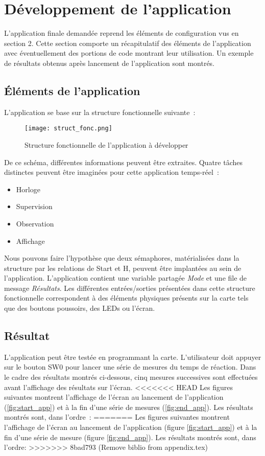\section{Développement de l'application}

L'application finale demandée reprend les éléments de configuration vus en section 2.
Cette section comporte un récapitulatif des éléments de l'application avec éventuellement des portions de code montrant leur utilisation.
Un exemple de résultats obtenus après lancement de l'application sont montrés.

\subsection{Éléments de l'application}

L'application se base sur la structure fonctionnelle suivante :

\begin{figure}[h]
    \centering
    \texttt{[image: struct\_fonc.png]}
    \caption{Structure fonctionnelle de l'application à développer}
    \label{fig:struct}
\end{figure}

De ce schéma, différentes informations peuvent être extraites.
Quatre tâches distinctes peuvent être imaginées pour cette application temps-réel :

\begin{itemize}
    \item Horloge
    \item Supervision
    \item Observation    
    \item Affichage
\end{itemize}

Nous pouvons faire l'hypothèse que deux sémaphores, matérialisées dans la structure par les relations de Start et H, peuvent être implantées au sein de l'application.
L'application contient une variable partagée \textit{Mode} et une file de message \textit{Résultats}.
Les différentes entrées/sorties présentées dans cette structure fonctionnelle correspondent à des éléments physiques présents sur la carte tels que des boutons poussoirs, des LEDs ou l'écran.

\subsection{Résultat}

L'application peut être testée en programmant la carte.
L'utilisateur doit appuyer sur le bouton SW0 pour lancer une série de mesures du temps de réaction.
Dans le cadre des résultats montrés ci-dessous, cinq mesures successives sont effectuées avant l'affichage des résultats sur l'écran.
<<<<<<< HEAD
Les figures suivantes montrent l'affichage de l'écran au lancement de l'application (\ref{fig:start_app}) et à la fin d'une série de mesures (\ref{fig:end_app}).
Les résultats montrés sont, dans l'ordre :
=======
Les figures suivantes montrent l'affichage de l'écran au lancement de l'application (figure \ref{fig:start_app}) et à la fin d'une série de mesure (figure \ref{fig:end_app}).
Les résultats montrés sont, dans l'ordre:
>>>>>>> 8bad793 (Remove biblio from appendix.tex)

